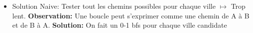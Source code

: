\begin{frame}
    \frametitle{\problemtitle}
    \begin{itemize}
        \begin{block}{Problème}
            \textbf{Problem:} Un graphe avec $n$ villes et $m$ villes candidates, Trouver la ville candidate dont le cycle est le plus petit.
        \end{block}
        \item<+-> Solution Naive: Tester tout les chemins possibles pour chaque ville $\mapsto$ Trop lent.
        \textbf{Observation:} Une boucle peut s'exprimer comme une chemin de A à B et de B à A.
        \textbf{Solution:} On fait un 0-1 bfs pour chaque ville candidate
    \end{itemize}
\end{frame}
